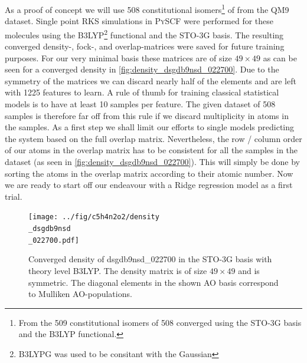 As a proof of concept we will use 508 constitutional isomers\footnote{From the 509 constitutional isomers of  508 converged using the STO-3G basis and the B3LYP functional.} of  from the QM9 dataset. 
Single point RKS simulations in \textsc{PySCF} \parencite{ref:pyscf} were performed for these molecules using the B3LYP\footnote{B3LYPG was used to be consitant with the Gaussian} functional and the STO-3G basis. The resulting converged density-, fock-, and overlap-matrices were saved for future training purposes. For our very minimal basis these matrices are of size $49 \times 49$ as can be seen for a converged density in \autoref{fig:density_dsgdb9nsd_022700}. 
Due to the symmetry of the matrices we can discard nearly half of the elements and are left with 1225 features to learn. A rule of thumb for training classical statistical models is to have at least 10 samples per feature. \parencite{ref:rule_of_10} The given dataset of 508 samples is therefore far off from this rule if we discard multiplicity in atoms in the samples. As a first step we shall limit our efforts to single models predicting the system based on the full overlap matrix. Nevertheless, the row / column order of our atoms in the overlap matrix has to be consistent for all the samples in the dataset (as seen in \autoref{fig:density_dsgdb9nsd_022700}). This will simply be done by sorting the atoms in the overlap matrix according to their atomic number. Now we are ready to start off our endeavour with a Ridge regression model as a first trial. 

\begin{figure}[H]
    \centering
    \texttt{[image: ../fig/c5h4n2o2/density\\\_dsgdb9nsd\\\_022700.pdf]}
    \caption[Density matrix of dsgdb9nsd\_022700 in the STO-3G basis with theory level B3LYP]{Converged density of dsgdb9nsd\_022700 in the STO-3G basis with theory level B3LYP. The density matrix is of size $49 \times 49$ and is symmetric. The diagonal elements in the shown AO basis correspond to Mulliken AO-populations. }
    \label{fig:density_dsgdb9nsd_022700}
\end{figure}


